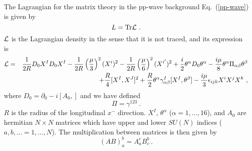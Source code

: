 \documentclass[a4paper,12pt]{article}
\begin{document}
The Lagrangian \cite{ber021,das185} for the matrix theory in the
pp-wave background Eq.~(\ref{pp-wave}) is given
by
\begin{equation}
L = {\rm Tr} {\cal L}~.
\label{lag}
\end{equation}
${\cal L}$ is the Lagrangian density in the sense that it is not
traced, and its expression is
\begin{eqnarray}
{\cal L}
 &=& \frac{1}{2R} D_0 X^I D_0 X^I
 -\frac{1}{2R} \left( \frac{\mu}{3} \right)^2 (X^i)^2
 -\frac{1}{2R} \left( \frac{\mu}{6} \right)^2 (X^{i'})^2
 + \frac{i}{2} \theta^\alpha D_0 \theta^\alpha
 - \frac{i\mu}{8} \theta^\alpha
        \Pi_{\alpha \beta} \theta^\beta
                    \nonumber \\
 & & + \frac{R}{4} [ X^I, X^J ]^2
 + \frac{R}{2} \theta^\alpha
      \gamma^I_{\alpha\beta}
      [ X^I, \theta^\beta ]
 - \frac{i\mu}{3} \epsilon_{ijk} X^i X^j X^k~,
\end{eqnarray}
where $D_0 = \partial_0 - i [A_0, ]$ and we have defined
\begin{equation}
\Pi = \gamma^{123}~.
\end{equation}
$R$ is the radius of the longitudinal $x^-$ direction. $X^I$,
$\theta^\alpha$ ($\alpha=1,...,16$), and $A_0$ are hermitian $N \times
N$ matrices which have upper and lower $SU(N)$ indices ($a,b,... =
1,...,N$).  The multiplication between matrices is then given by
\begin{equation}
(AB)^b_a = A^c_a B^b_c~.
\end{equation}
\end{document}

